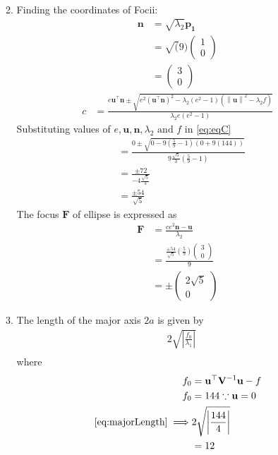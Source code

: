 \documentclass[12pt]{article}
\providecommand{\brak}[1]{\ensuremath{\left(#1\right)}}
\providecommand{\norm}[1]{\left\lVert#1\right\rVert}
\providecommand{\abs}[1]{\left\vert#1\right\vert}
\newcommand{\myvec}[1]{\ensuremath{\begin{pmatrix}#1\end{pmatrix}}}
\let\vec\mathbf
\begin{document}
\begin{enumerate}
\begin{enumerate}
\begin{align}
\end{align}
\item Finding the coordinates of Focii: 
\begin{align}
	\vec{n} &= \sqrt{\lambda_2}\vec{p_1} \\
	&= \sqrt(9)\myvec{1 \\ 0} \\
	\label{eq:eqN}
	&= \myvec{3 \\ 0} 
\end{align}
\begin{align}
	\label{eq:eqC}
	c  &=    \frac{e\vec{u}^{\top}\vec{n} \pm \sqrt{e^2\brak{\vec{u}^{\top}\vec{n}}^2-\lambda_2\brak{e^2-1}\brak{\norm{\vec{u}}^2 - \lambda_2 f}}}{\lambda_2e\brak{e^2-1}} 
\end{align}
Substituting values of $e, \vec{u}, \vec{n}, \lambda_2 \text{ and } f$ in \eqref{eq:eqC}
\begin{align}
	&=    \frac{0 \pm \sqrt{0-9\brak{\frac{5}{9}-1}\brak{{0 + 9\brak{144}}}}}{9\frac{\sqrt{5}}{3}\brak{\frac{5}{9}-1}} \\ 
	&=    \frac{ \pm 72}{-4\frac{\sqrt{5}}{3}}  \\ 
	&=    \frac{ \pm 54}{\sqrt{5}} 
\end{align}
The focus $\vec{F}$ of ellipse is expressed as
\begin{align}
	\vec{F} &= \frac{ce^2\vec{n}-\vec{u}}{\lambda_2} \\
	&= \frac{\frac{ \pm 54}{\sqrt{5}} \brak{\frac{5}{9}}\myvec{3 \\0}}{9} \\
	&= \pm \myvec{2\sqrt{5} \\ 0}
\end{align}
\item  The length of the major axis $2a$ is given by
\begin{align}
	\label{eq:majorLength}
	& 2\sqrt{\abs{\frac{f_0}{\lambda_1}}}\\
\end{align}
where
\begin{align}
	 f_0 &= \vec{u}^\top\vec{V}^{-1}\vec{u}-f \\
	 f_0 &= 144 \because \vec{u} = 0 \\
	\eqref{eq:majorLength} \implies  & 2\sqrt{\abs{\frac{144}{4}}}\\
	&= 12
\end{align}


\end{enumerate}
\end{enumerate}
\end{document}
